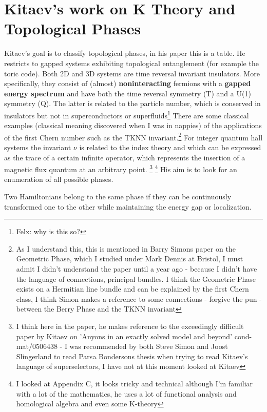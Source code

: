 \section{Kitaev's work on K Theory and Topological Phases}
Kitaev's goal is to classify topological phases, in his paper this is a table. 
He restricts to gapped systems exhibiting topological entanglement (for example the toric code). 
Both 2D and 3D systems are time reversal invariant insulators. More specifically, they consist of 
(almost) \textbf{noninteracting} fermions with a \textbf{gapped energy spectrum} and have both the
time reversal symmetry (T) and a U(1) symmetry (Q). The latter is related to the particle number, which is conserved
in insulators but not in superconductors or superfluids\footnote{ Felx: why is this so?}
   There are some classical examples (classical meaning discovered when I was in nappies) of the applications
   of the first Chern number such as the TKNN invariant.\footnote{As I understand this, this is mentioned in 
 Barry Simons paper on the Geometric Phase, which I studied under Mark Dennis at Bristol, I must admit I didn't understand
 the paper until a year ago - because I didn't have the language of connections, principal bundles. I think the Geometric
 Phase exists on a Hermitian line bundle and can be explained by the first Chern class, I think Simon makes a reference
 to some connections - forgive the pun - between the Berry Phase and the TKNN invariant}
For integer quantum hall systems the invariant $\nu$ is related to the index theory and which 
can be expressed as the trace of a certain infinite operator, which represents the insertion of a magnetic flux
quantum at an arbitrary point. \footnote{I think here in the paper, he makes reference to the exceedingly difficult paper by
Kitaev on 'Anyons in an exactly solved model and beyond' cond-mat/0506438 - I was recommended by both Steve Simon and 
Joost Slingerland to read Parsa Bondersons thesis when trying to read Kitaev's language of superselectors, I have not 
at this moment looked at Kitaev} \footnote{I looked at Appendix C, it looks tricky and technical although I'm familiar
with a lot of the mathematics, he uses a lot of functional analysis and homological algebra and even some K-theory}
   His aim is to look for an enumeration of all possible phases. 
   \begin{definition}
    Two Hamiltonians belong to the same phase if they can be continuously transformed one to the other 
    while maintaining the energy gap or localization. 
   \end{definition}
